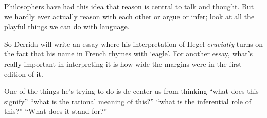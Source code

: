 Philosophers have had this idea that reason is central to talk and thought. But we hardly ever actually reason with each other or argue or infer; look at all the playful things we can do with language.

So Derrida will write an essay where his interpretation of Hegel \emph{crucially} turns on the fact that his name in French rhymes with `eagle'. For another essay, what's really important in interpreting it is how wide the margins were in the first edition of it.

One of the things he's trying to do is de-center us from thinking ``what does this signify'' ``what is the rational meaning of this?'' ``what is the inferential role of this?'' ``What does it stand for?''